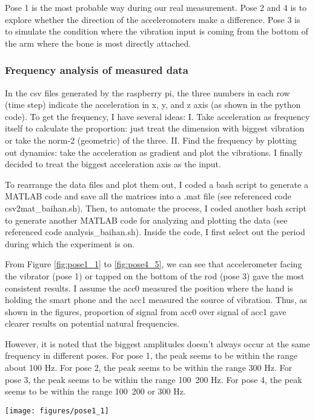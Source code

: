 \documentclass{sigchi}
\begin{document}
Pose 1 is the most probable way during our real measurement. Pose 2 and 4 is to explore whether the direction of the acceleromoters make a difference. Pose 3 is to simulate the condition where the vibration input is coming from the bottom of the arm where the bone is most directly attached.

\subsubsection{Frequency analysis of measured data} 

In the csv files generated by the raspberry pi, the three numbers in each row (time step) indicate the acceleration in x, y, and z axis (as shown in the python code). To get the frequency, I have several ideas: I. Take acceleration as frequency itself to calculate the proportion: just treat the dimension with biggest vibration or take the norm-2 (geometric) of the three. II. Find the frequency by plotting out dynamics: take the acceleration as gradient and plot the vibrations. I finally decided to treat the biggest acceleration axis as the input. 

To rearrange the data files and plot them out, I coded a bash script to generate a MATLAB code and save all the matrices into a .mat file (see referenced code csv2mat\_baihan.sh). Then, to automate the process, I coded another bash script to generate another MATLAB code for analyzing and plotting the data (see referenced code analysis\_baihan.sh). Inside the code, I first select out the period during which the experiment is on.

From Figure \ref{fig:pose1_1} to \ref{fig:pose4_5}, we can see that accelerometer facing the vibrator (pose 1) or tapped on the bottom of the rod (pose 3) gave the most consistent results. I assume the acc0 measured the position where the hand is holding the smart phone and the acc1 measured the source of vibration. Thus, as shown in the figures, proportion of signal from acc0 over signal of acc1 gave clearer results on potential natural frequencies.

However, it is noted that the biggest amplitudes doesn't always occur at the same frequency in different poses. For pose 1, the peak seems to be within the range about 100 Hz. For pose 2, the peak seems to be within the range 300 Hz. For pose 3, the peak seems to be within the range 100~200 Hz. For pose 4, the peak seems to be within the range 100~200 or 300 Hz.

\begin{figure*}
  \centering
  \texttt{[image: figures/pose1\_1]}
  \caption{accelerometer signals vs. frequency swept in pose 1 experiment 1}
    ~\label{fig:pose1_1}
\end{figure*}
\end{document}
